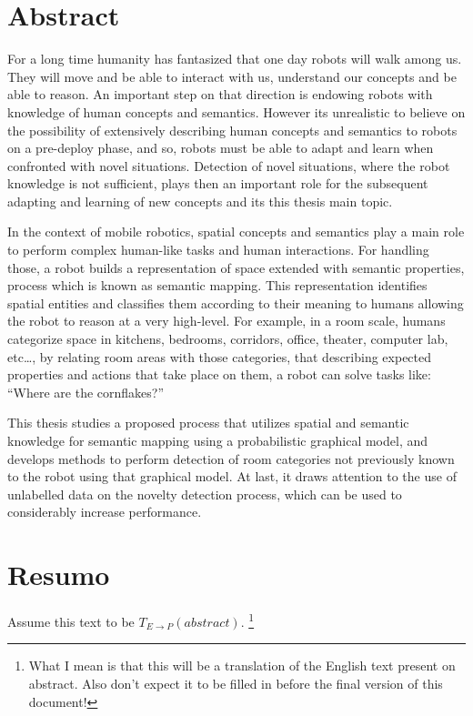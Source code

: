\chapter*{Abstract}
For a long time humanity has fantasized that one day robots will walk among us.
They will move and be able to interact with us, understand our concepts and
be able to reason.
An important step on that direction is endowing robots with knowledge of human concepts and
semantics. However its unrealistic to believe on the possibility of extensively
describing human concepts and semantics to robots on a pre-deploy phase, and so, robots must be able
to adapt and learn when confronted with novel situations.
Detection of novel situations, where the robot knowledge is not sufficient, plays then an important
role for the subsequent adapting and learning of new concepts and its this thesis main topic.

In the context of mobile robotics, spatial concepts and semantics play a main role to perform
complex human-like tasks and human interactions. For handling those, a robot builds a representation
of space extended with semantic properties, process which is known as semantic mapping.
This representation identifies spatial entities and classifies them according to their meaning to
humans allowing the robot to reason at a very high-level.
For example, in a room scale, humans categorize space in kitchens, bedrooms, corridors,
office, theater, computer lab, etc\dots, by relating room areas with those categories, that describing expected
properties and actions that take place on them, a robot can solve tasks like:
``Where are the cornflakes?''

This thesis studies a proposed %
process that utilizes spatial and semantic knowledge for semantic mapping using a
probabilistic graphical model,
and develops methods to perform detection of room categories not previously
known to the robot using that graphical model.
At last, it draws attention to the use of unlabelled data on the novelty detection process,
which can be used to considerably increase performance.


\chapter*{Resumo}
Assume this text to be $T_{E \rightarrow P}(abstract)$.
\footnote{What I mean is that this will be a translation of the English text
present on abstract. Also don't expect it to be filled in before the final
version of this document!}

